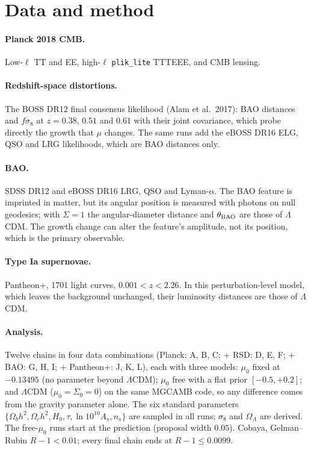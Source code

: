\section{Data and method}
\paragraph{Planck 2018 CMB.} Low-$\ell$ TT and EE, high-$\ell$ \texttt{plik\_lite} TTTEEE, and CMB lensing.
\paragraph{Redshift-space distortions.} The BOSS DR12 final consensus likelihood (Alam et al.\ 2017): BAO distances and $f\sigma_8$ at $z=0.38$, $0.51$
and $0.61$ with their joint covariance, which probe directly the growth that $\mu$ changes. The same runs add the eBOSS DR16 ELG, QSO and LRG likelihoods,
which are BAO distances only.
\paragraph{BAO.} SDSS DR12 and eBOSS DR16 LRG, QSO and Lyman-$\alpha$. The BAO feature is imprinted in matter, but its angular position is measured with
photons on null geodesics; with $\Sigma=1$ the angular-diameter distance and $\theta_{\rm BAO}$ are those of $\Lambda$CDM. The growth change can alter the
feature's amplitude, not its position, which is the primary observable.
\paragraph{Type Ia supernovae.} Pantheon+, 1701 light curves, $0.001<z<2.26$. In this perturbation-level model, which leaves the background unchanged,
their luminosity distances are those of $\Lambda$CDM.
\paragraph{Analysis.} Twelve chains in four data combinations (Planck: A, B, C; + RSD: D, E, F; + BAO: G, H, I; + Pantheon+: J, K, L), each with three models:
$\mu_0$ fixed at $-0.13495$ (no parameter beyond $\Lambda$CDM); $\mu_0$ free with a flat prior $[-0.5,+0.2]$; and $\Lambda$CDM ($\mu_0=\Sigma_0=0$) on the same
MGCAMB code, so any difference comes from the gravity parameter alone. The six standard parameters $\{\Omega_bh^2,\Omega_ch^2,H_0,\tau,\ln10^{10}A_s,n_s\}$ are
sampled in all runs; $\sigma_8$ and $\Omega_\Lambda$ are derived. The free-$\mu_0$ runs start at the prediction (proposal width $0.05$). Cobaya, Gelman--Rubin $R-1<0.01$; every final chain ends at $R-1\le0.0099$.

